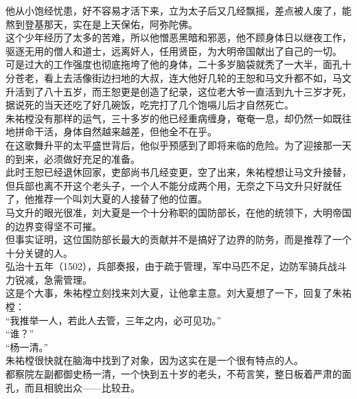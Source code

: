 \begin{multicols}{\theparacolNo}
他从小饱经忧患，好不容易才活下来，立为太子后又几经飘摇，差点被人废了，能熬到登基那天，实在是上天保佑，阿弥陀佛。\\

这个少年经历了太多的苦难，所以他憎恶黑暗和邪恶，他不顾身体日以继夜工作，驱逐无用的僧人和道士，远离奸人，任用贤臣，为大明帝国献出了自己的一切。\\

可是过大的工作强度也彻底拖垮了他的身体，二十多岁脑袋就秃了一大半，面孔十分苍老，看上去活像街边扫地的大叔，连大他好几轮的王恕和马文升都不如，马文升活到了八十五岁，而王恕更是创造了纪录，这位老大爷一直活到九十三岁才死，据说死的当天还吃了好几碗饭，吃完打了几个饱嗝儿后才自然死亡。\\

朱祐樘没有那样的运气，三十多岁的他已经重病缠身，奄奄一息，却仍然一如既往地拼命干活，身体自然越来越差，但他全不在乎。\\

在这歌舞升平的太平盛世背后，他似乎预感到了即将来临的危险。为了迎接那一天的到来，必须做好充足的准备。\\

此时王恕已经退休回家，吏部尚书几经变更，空了出来，朱祐樘想让马文升接替，但兵部也离不开这个老头子，一个人不能分成两个用，无奈之下马文升只好就任了，他推荐一个叫刘大夏的人接替了他的位置。\\

马文升的眼光很准，刘大夏是一个十分称职的国防部长，在他的统领下，大明帝国的边界变得坚不可摧。\\

但事实证明，这位国防部长最大的贡献并不是搞好了边界的防务，而是推荐了一个十分关键的人。\\

弘治十五年（1502），兵部奏报，由于疏于管理，军中马匹不足，边防军骑兵战斗力锐减，急需管理。\\

这是个大事，朱祐樘立刻找来刘大夏，让他拿主意。刘大夏想了一下，回复了朱祐樘：\\

“我推举一人，若此人去管，三年之内，必可见功。”\\

“谁？”\\

“杨一清。”\\

朱祐樘很快就在脑海中找到了对象，因为这实在是一个很有特点的人。\\

都察院左副都御史杨一清，一个快到五十岁的老头，不苟言笑，整日板着严肃的面孔，而且相貌出众——比较丑。\\


\end{multicols}
